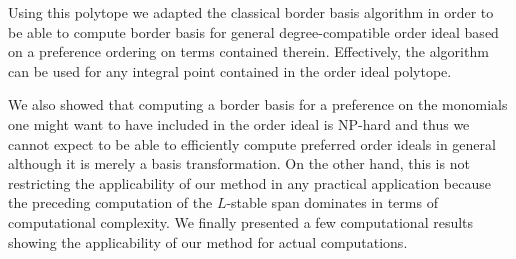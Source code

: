 \documentclass[11pt,oneside,english]{amsart}
\makeatletter
\numberwithin{equation}{section}
\numberwithin{figure}{section}
\theoremstyle{plain}
\theoremstyle{definition}
\theoremstyle{definition}
\theoremstyle{remark}
\theoremstyle{plain}
\theoremstyle{plain}
\theoremstyle{plain}
\theoremstyle{problem@}
\makeatother
\begin{document}
Using this polytope we adapted the
classical border basis algorithm in order to be able to compute border basis
for general degree-compatible order ideal based on a preference ordering on
terms contained therein. Effectively, the algorithm can be used for any integral point contained in the order ideal polytope. 

We also showed that computing a border basis for a preference on the monomials one might want to have included in the order ideal is {\textrm{NP}\xspace}-hard and thus we cannot expect to be able to efficiently compute preferred order ideals in general although it is merely  a basis transformation. On the other hand, this is not restricting the applicability of our method in any practical application because the preceding computation of the $L$-stable span dominates in terms of computational complexity. We finally presented a few computational results showing the applicability of our method for actual computations. 



\end{document}
